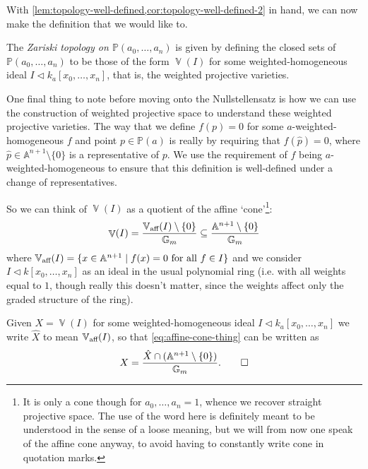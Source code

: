 \documentclass[10pt,notitlepage]{article}
\numberwithin{equation}{subsection}
\DeclareMathOperator{\van}{\mathbb{V}}
\DeclareMathOperator{\vanaff}{\mathbb{V}_{\textnormal{aff}}}
\newcommand{\aff}{\mathbb{A}}
\newcommand{\pee}{\mathbb{P}}
\newcommand{\gm}{\mathbb{G}_m}
\newcommand{\noz}{\setminus\{0\}}
\newcommand{\kazn}{k_a[x_0,\ldots,x_n]}
\newcommand{\pazn}{\pee(a_0,\ldots,a_n)}
\begin{document}
    With \cref{lem:topology-well-defined,cor:topology-well-defined-2} in hand, we can now make the definition that we would like to.

    \begin{definition}\label{defn:zariski-topology}
        The \emph{Zariski topology on $\pazn$} is given by defining the closed sets of $\pazn$ to be those of the form $\van(I)$ for some weighted-homogeneous ideal $I\triangleleft \kazn$, that is, the weighted projective varieties.
    \end{definition}

    One final thing to note before moving onto the Nullstellensatz is how we can use the construction of weighted projective space to understand these weighted projective varieties.
    The way that we define $f(p)=0$ for some $a$-weighted-homogeneous $f$ and point $p\in\pee(a)$ is really by requiring that $f(\hat{p})=0$, where $\hat{p}\in\aff^{n+1}\noz$ is a representative of $p$.
    We use the requirement of $f$ being $a$-weighted-homogeneous to ensure that this definition is well-defined under a change of representatives.

    So we can think of $\van(I)$ as a quotient of the affine `cone'\footnote{%
        It is only a cone though for $a_0,\ldots,a_n=1$, whence we recover straight projective space.
        The use of the word here is definitely meant to be understood in the sense of a loose meaning, but we will from now one speak of the affine cone anyway, to avoid having to constantly write cone in quotation marks.
    }:
    \begin{equation}\label{eq:affine-cone-thing}
        \van(I) = \frac{\vanaff(I)\noz}{\gm} \subseteq \frac{\aff^{n+1}\noz}{\gm}
    \end{equation}
    where $\vanaff(I)=\{x\in\aff^{n+1} \mid f(x)=0\text{ for all }f\in I\}$ and we consider $I\triangleleft k[x_0,\ldots,x_n]$ as an ideal in the usual polynomial ring (i.e. with all weights equal to $1$, though really this doesn't matter, since the weights affect only the graded structure of the ring).

    \begin{definition}\label{defn:affine-cone-thing}
        Given $X=\van(I)$ for some weighted-homogeneous ideal $I\triangleleft\kazn$ we write $\hat{X}$ to mean $\vanaff(I)$, so that \cref{eq:affine-cone-thing} can be written as
        \[
            X = \frac{\hat{X}\cap(\aff^{n+1}\noz)}{\gm}.\qedhere
        \]
    \end{definition}
\end{document}
